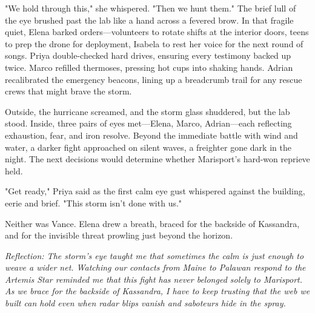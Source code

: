 "We hold through this," she whispered. "Then we hunt them." The brief lull of the eye brushed past the lab like a hand across a fevered brow. In that fragile quiet, Elena barked orders—volunteers to rotate shifts at the interior doors, teens to prep the drone for deployment, Isabela to rest her voice for the next round of songs. Priya double-checked hard drives, ensuring every testimony backed up twice. Marco refilled thermoses, pressing hot cups into shaking hands. Adrian recalibrated the emergency beacons, lining up a breadcrumb trail for any rescue crews that might brave the storm.

Outside, the hurricane screamed, and the storm glass shuddered, but the lab stood. Inside, three pairs of eyes met—Elena, Marco, Adrian—each reflecting exhaustion, fear, and iron resolve. Beyond the immediate battle with wind and water, a darker fight approached on silent waves, a freighter gone dark in the night. The next decisions would determine whether Marisport's hard-won reprieve held.

"Get ready," Priya said as the first calm eye gust whispered against the building, eerie and brief. "This storm isn't done with us."

Neither was Vance. Elena drew a breath, braced for the backside of Kassandra, and for the invisible threat prowling just beyond the horizon.

\noindent\textit{Reflection: The storm's eye taught me that sometimes the calm is just enough to weave a wider net. Watching our contacts from Maine to Palawan respond to the \textit{Artemis Star} reminded me that this fight has never belonged solely to Marisport. As we brace for the backside of Kassandra, I have to keep trusting that the web we built can hold even when radar blips vanish and saboteurs hide in the spray.}

